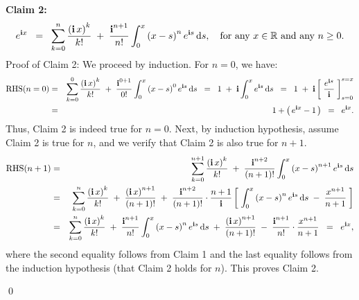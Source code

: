 \vskip 0.5cm

\begin{center}
\begin{minipage}{6.5in}
\noindent
\textbf{Claim 2:}
\begin{equation*}
e^{\textnormal{\bf i} x}
\;\;=\;\;
\sum_{k=0}^{n}\dfrac{\left(\textnormal{\bf i}\,x\right)^{k}}{k!}
\;+\; \dfrac{\textnormal{\bf i}^{n+1}}{n!}\int_{0}^{x}\left(x-s\right)^{n}e^{\textnormal{\bf i} s}\,\textnormal{d} s,
\quad
\textnormal{for any $x \in \mathbb{R}$ and any $n \geq 0$.}
\end{equation*}
Proof of Claim 2: We proceed by induction.
For $n = 0$, we have:
\begin{eqnarray*}
\textnormal{RHS}(n=0)
&=&
\sum_{k=0}^{0}\dfrac{\left(\textnormal{\bf i}\,x\right)^{k}}{k!}
\;+\; \dfrac{\textnormal{\bf i}^{0+1}}{0!}\int_{0}^{x}\left(x-s\right)^{0}e^{\textnormal{\bf i} s}\,\textnormal{d} s
\;\;=\;\; 1 \;+\; \textnormal{\bf i}\int_{0}^{x} e^{\textnormal{\bf i} s}\,\textnormal{d} s
\;\;=\;\; 1 \;+\; \textnormal{\bf i}\left[\;\dfrac{e^{\textnormal{\bf i} s}}{\textnormal{\bf i}}\;\right]_{s=0}^{s=x}
\\
&=& 1 + \left(\,e^{\textnormal{\bf i} x} - 1\,\right) \;\;=\;\; e^{\textnormal{\bf i} x}.
\end{eqnarray*}
Thus, Claim 2 is indeed true for $n = 0$.
Next, by induction hypothesis, assume Claim 2 is true for $n$,
and we verify that Claim 2 is also true for $n+1$.
\begin{eqnarray*}
\textnormal{RHS}(n+1)
&=& \sum_{k=0}^{n+1}\dfrac{\left(\textnormal{\bf i}\,x\right)^{k}}{k!} \;+\; \dfrac{\textnormal{\bf i}^{n+2}}{(n+1)!}\int_{0}^{x}\left(x-s\right)^{n+1}e^{\textnormal{\bf i} s}\,\textnormal{d} s
\\
&=&
\sum_{k=0}^{n}\dfrac{\left(\textnormal{\bf i}\,x\right)^{k}}{k!}
\;+\; \dfrac{\left(\textnormal{\bf i}\,x\right)^{n+1}}{(n+1)!}
\;+\; \dfrac{\textnormal{\bf i}^{n+2}}{(n+1)!}\cdot\dfrac{n+1}{\textnormal{\bf i}}\left[\;\int_{0}^{x}\left(x-s\right)^{n}e^{\textnormal{\bf i} s}\,\textnormal{d} s \;-\; \dfrac{x^{n+1}}{n+1} \;\right]
\\
&=& 
\sum_{k=0}^{n}\dfrac{\left(\textnormal{\bf i}\,x\right)^{k}}{k!}
\;+\; \dfrac{\textnormal{\bf i}^{n+1}}{n!}\int_{0}^{x}\left(x-s\right)^{n}e^{\textnormal{\bf i} s}\,\textnormal{d} s
\;+\; \dfrac{\left(\textnormal{\bf i}\,x\right)^{n+1}}{(n+1)!}
\;-\; \dfrac{\textnormal{\bf i}^{n+1}}{n!}\cdot\dfrac{x^{n+1}}{n+1}
\;\;=\;\; e^{\textnormal{\bf i} x},
\end{eqnarray*}
where the second equality follows from Claim 1 and the last equality follows from the induction hypothesis (that Claim 2 holds for $n$).
This proves Claim 2.
\end{minipage}
\end{center}
\qed

